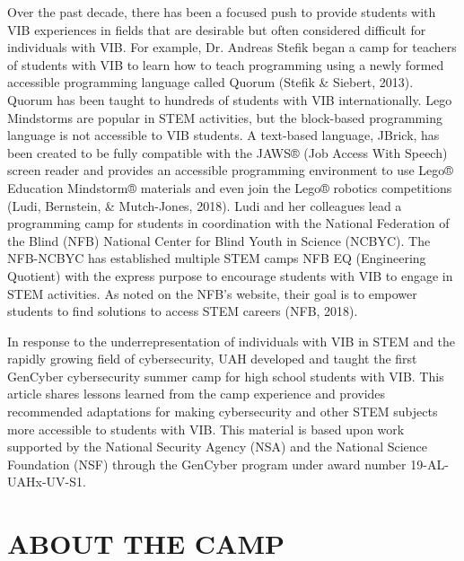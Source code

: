 \documentclass[11.5pt]{sig-alternate} %
\begin{document}
\begin{large}
Over the past decade, there has been a focused push to provide students with VIB experiences in fields that are desirable but often considered difficult for individuals with VIB. For example, Dr. Andreas Stefik began a camp for teachers of students with VIB to learn how to teach programming using a newly formed accessible programming language called Quorum (Stefik \& Siebert, 2013). Quorum has been taught to hundreds of students with VIB internationally. Lego Mindstorms are popular in STEM activities, but the block-based programming language is not accessible to VIB students. A text-based language, JBrick, has been created to be fully compatible with the JAWS® (Job Access With Speech) screen reader and provides an accessible programming environment to use Lego® Education Mindstorm® materials and even join the Lego® robotics competitions (Ludi, Bernstein, \& Mutch-Jones, 2018). Ludi and her colleagues lead a programming camp for students in coordination with the National Federation of the Blind (NFB) National Center for Blind Youth in Science (NCBYC). The NFB-NCBYC has established multiple STEM camps NFB EQ (Engineering Quotient) with the express purpose to encourage students with VIB to engage in STEM activities. As noted on the NFB’s website, their goal is to empower students to find solutions to access STEM careers (NFB, 2018).

In response to the underrepresentation of individuals with VIB in STEM and the rapidly growing field of cybersecurity, UAH developed and taught the first GenCyber cybersecurity summer camp for high school students with VIB. This article shares lessons learned from the camp experience and provides recommended adaptations for making cybersecurity and other STEM subjects more accessible to students with VIB. This material is based upon work supported by the National Security Agency (NSA) and the National Science Foundation (NSF) through the GenCyber program under award number 19-AL-UAHx-UV-S1.

\section*{ABOUT THE CAMP}


\end{large}
\end{document}
